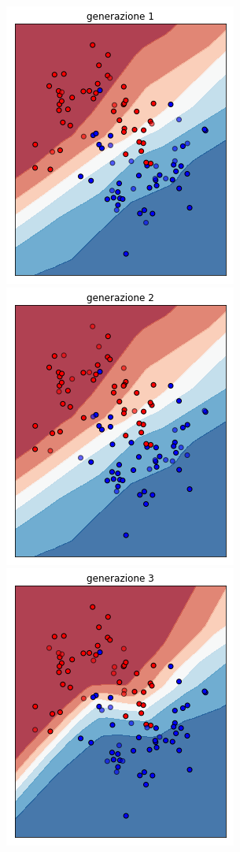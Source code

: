 \documentclass[12pt,a4paper]{report}
\begin{document}
\begin{figure}[H]
 \centering
 \includegraphics[scale = 0.3]{images/moons-sons-acc./1}
 \includegraphics[scale = 0.3]{images/moons-sons-acc./2}
 \includegraphics[scale = 0.3]{images/moons-sons-acc./3}

\end{figure}
\end{document}
